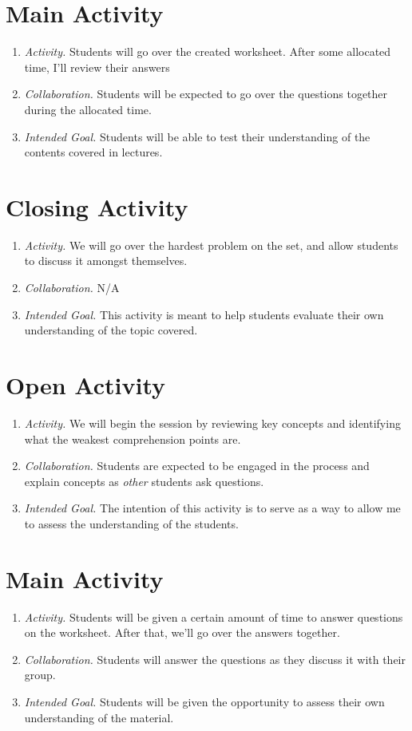 \documentclass[11pt]{article}
\begin{document}
\section{\centering Main Activity}
	\begin{enumerate}
		\item \textit{Activity.} Students will go over the created worksheet. After some allocated time, I'll review their answers
		\item \textit{Collaboration.} Students will be expected to go over the questions together during the allocated time.
		\item \textit{Intended Goal.} Students will be able to test their understanding of the contents covered in lectures.
	\end{enumerate}
\section{\centering Closing Activity}
	\begin{enumerate}
		\item \textit{Activity.} We will go over the hardest problem on the set, and allow students to discuss it amongst themselves.
		\item \textit{Collaboration.} N/A
		\item \textit{Intended Goal.} This activity is meant to help students evaluate their own understanding of the topic covered.
	\end{enumerate}

\newpage
{}
\section{\centering Open Activity}
	\begin{enumerate}
		\item \textit{Activity.} We will begin the session by reviewing key concepts and identifying what the weakest comprehension points are.
		\item \textit{Collaboration.} Students are expected to be engaged in the process and explain concepts as \emph{other} students ask questions.
		\item \textit{Intended Goal.} The intention of this activity is to serve as a way to allow me to assess the understanding of the students.
	\end{enumerate}

\section{\centering Main Activity}
	\begin{enumerate}
		\item \textit{Activity.} Students will be given a certain amount of time to answer questions on the worksheet. After that, we'll go over the answers 
			together.
		\item \textit{Collaboration.} Students will answer the questions as they discuss it with their group.
		\item \textit{Intended Goal.} Students will be given the opportunity to assess their own understanding of the material.
	\end{enumerate}
\end{document}
